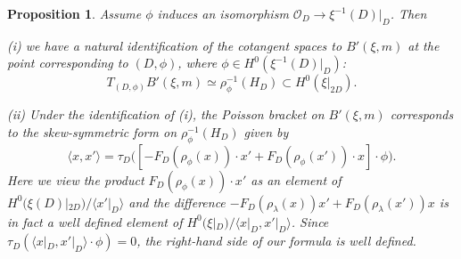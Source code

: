 \documentclass[reqno]{amsart}
\newtheorem{prop}[theorem]{Proposition}
\theoremstyle{definition}
\theoremstyle{remark}
\newcommand{\OO}{{\mathcal O}}
\newcommand{\sub}{\subset}
\newcommand{\la}{\lambda}
\newcommand{\lan}{\langle}
\newcommand{\ran}{\rangle}
\numberwithin{equation}{section}
\begin{document}
\begin{prop}\label{prop:poi-p=1}
Assume $\phi$ induces an isomorphism $\OO_D\to \xi^{-1}(D)|_D$. Then 

\noindent
(i) we have a natural identification of the cotangent spaces to $B'(\xi,m)$ at the point corresponding
to $(D,\phi)$, where $\phi\in H^0(\xi^{-1}(D)|_D)$:
$$T_{(D,\phi)}B'(\xi,m)\simeq \rho_\phi^{-1}(H_D)\sub H^0(\xi|_{2D}).$$


\noindent
(ii) Under the identification of (i), the Poisson bracket on $B'(\xi,m)$ corresponds to the skew-symmetric form on $\rho_\phi^{-1}(H_D)$ given by
\begin{equation}\label{Pi-pairing-formula}
\lan x,x'\ran=\tau_D\bigl([-F_D(\rho_\phi(x))\cdot x'+F_D(\rho_\phi(x'))\cdot x]\cdot \phi\bigr).
\end{equation}
Here we view the product $F_D(\rho_\phi(x))\cdot x'$ as an element of $H^0(\xi(D)|_{2D})/\lan x'|_D\ran$ and the difference
$-F_D(\rho_\la(x))x'+F_D(\rho_\la(x'))x$ is in fact a well defined element of $H^0(\xi|_D)/\lan x|_D, x'|_D\ran$.
Since $\tau_D(\lan x|_D, x'|_D\ran\cdot\phi)=0$, the right-hand side of our formula is well defined.
\end{prop}
\end{document}
